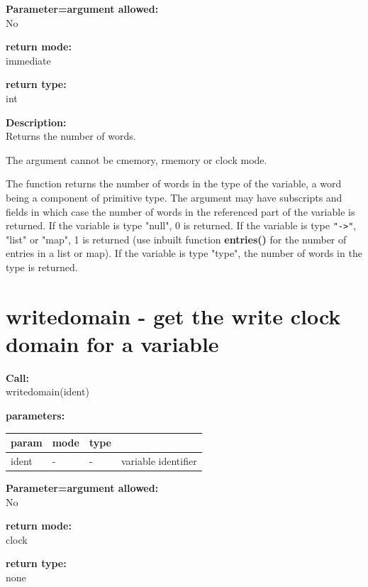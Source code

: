         {\bf Parameter=argument allowed:} \\
        No
        
        {\bf return mode:} \\
        immediate

        {\bf return type:} \\
        int
        
        {\bf Description:} \\
        Returns the number of words.
        
        The argument cannot be cmemory, rmemory or clock mode.
        
        The function returns the number of words in the type of the variable, a
        word being a component of primitive type. The argument may have
        subscripts and fields in which case the number of words in the
        referenced part of the variable is returned.
        If the variable is type "null", 0 is returned.
        If the variable is type \verb'"->"', "list" or "map", 1 is returned
        (use inbuilt function {\bf entries()}  for
        the number of entries in a list or map).
        If the variable is type "type", the number of words in the type
        is returned.
        


    \section{writedomain - get the write clock domain for a variable}\label{sec:ifwritedomain}
        
        {\bf Call:} \\
        writedomain(ident)
        
        {\bf parameters:} \\
        \begin{tabular}{| l | l | l | l |}
        \hline
        param  & mode & type & \\
        \hline \hline
        ident & - &  -  & variable identifier \\ \hline
        \end{tabular}
        
        {\bf Parameter=argument allowed:} \\
        No
        
        {\bf return mode:} \\
        clock

        {\bf return type:} \\
        none
        
